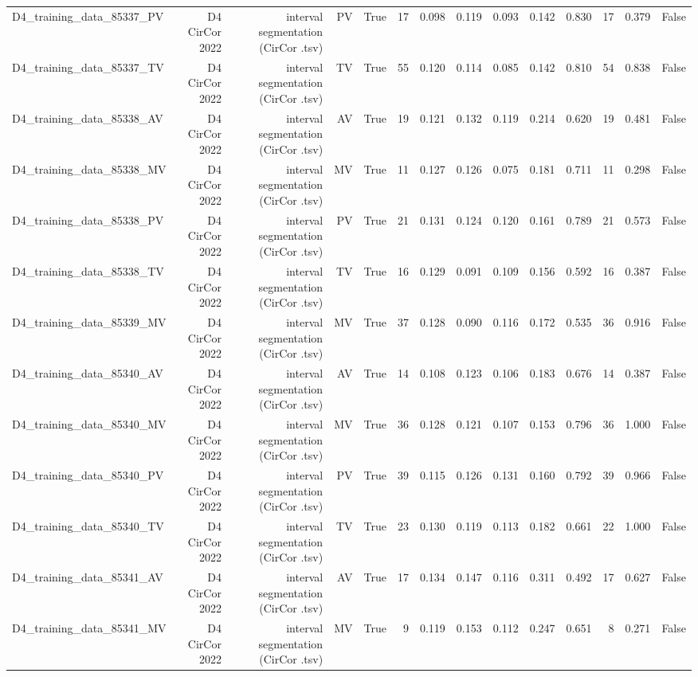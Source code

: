 \begin{table}[htbp]
\begin{tabular}{lrrrrrrrrrrrrr}
    D4\_training\_data\_85337\_PV & D4 CirCor 2022 & interval segmentation (CirCor .tsv) & PV & True & 17 & 0.098 & 0.119 & 0.093 & 0.142 & 0.830 & 17 & 0.379 & False \\
    D4\_training\_data\_85337\_TV & D4 CirCor 2022 & interval segmentation (CirCor .tsv) & TV & True & 55 & 0.120 & 0.114 & 0.085 & 0.142 & 0.810 & 54 & 0.838 & False \\
    D4\_training\_data\_85338\_AV & D4 CirCor 2022 & interval segmentation (CirCor .tsv) & AV & True & 19 & 0.121 & 0.132 & 0.119 & 0.214 & 0.620 & 19 & 0.481 & False \\
    D4\_training\_data\_85338\_MV & D4 CirCor 2022 & interval segmentation (CirCor .tsv) & MV & True & 11 & 0.127 & 0.126 & 0.075 & 0.181 & 0.711 & 11 & 0.298 & False \\
    D4\_training\_data\_85338\_PV & D4 CirCor 2022 & interval segmentation (CirCor .tsv) & PV & True & 21 & 0.131 & 0.124 & 0.120 & 0.161 & 0.789 & 21 & 0.573 & False \\
    D4\_training\_data\_85338\_TV & D4 CirCor 2022 & interval segmentation (CirCor .tsv) & TV & True & 16 & 0.129 & 0.091 & 0.109 & 0.156 & 0.592 & 16 & 0.387 & False \\
    D4\_training\_data\_85339\_MV & D4 CirCor 2022 & interval segmentation (CirCor .tsv) & MV & True & 37 & 0.128 & 0.090 & 0.116 & 0.172 & 0.535 & 36 & 0.916 & False \\
    D4\_training\_data\_85340\_AV & D4 CirCor 2022 & interval segmentation (CirCor .tsv) & AV & True & 14 & 0.108 & 0.123 & 0.106 & 0.183 & 0.676 & 14 & 0.387 & False \\
    D4\_training\_data\_85340\_MV & D4 CirCor 2022 & interval segmentation (CirCor .tsv) & MV & True & 36 & 0.128 & 0.121 & 0.107 & 0.153 & 0.796 & 36 & 1.000 & False \\
    D4\_training\_data\_85340\_PV & D4 CirCor 2022 & interval segmentation (CirCor .tsv) & PV & True & 39 & 0.115 & 0.126 & 0.131 & 0.160 & 0.792 & 39 & 0.966 & False \\
    D4\_training\_data\_85340\_TV & D4 CirCor 2022 & interval segmentation (CirCor .tsv) & TV & True & 23 & 0.130 & 0.119 & 0.113 & 0.182 & 0.661 & 22 & 1.000 & False \\
    D4\_training\_data\_85341\_AV & D4 CirCor 2022 & interval segmentation (CirCor .tsv) & AV & True & 17 & 0.134 & 0.147 & 0.116 & 0.311 & 0.492 & 17 & 0.627 & False \\
    D4\_training\_data\_85341\_MV & D4 CirCor 2022 & interval segmentation (CirCor .tsv) & MV & True & 9 & 0.119 & 0.153 & 0.112 & 0.247 & 0.651 & 8 & 0.271 & False \\

\end{tabular}
\end{table}
